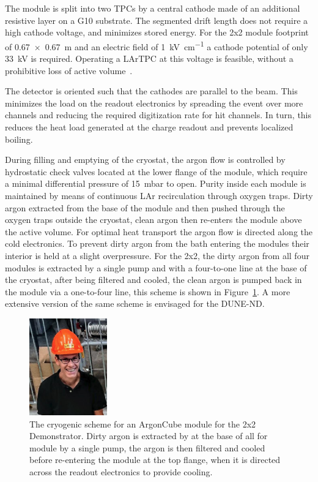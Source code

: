 The module is split into two TPCs by a central cathode made of an additional resistive layer on a G10 substrate. The segmented drift length does not require a high cathode voltage, and minimizes stored energy. For the 2x2 module footprint of \SI{0.67 x 0.67}{\metre} and an electric field of \SI{1}{\kilo\volt\per\centi\metre} a cathode potential of only \SI{33}{\kilo\volt} is required. Operating a LArTPC at this voltage is feasible, without a prohibitive loss of active volume~\cite{argontube}.

The detector is oriented such that the cathodes are parallel to the beam. This minimizes the load on the readout electronics by spreading the event over more channels and reducing the required digitization rate for hit channels. In turn, this reduces the heat load generated at the charge readout and prevents localized boiling.

During filling and emptying of the cryostat, the argon flow is controlled by hydrostatic check valves located at the lower flange of the module, which require a minimal differential pressure of \SI{15}{\milli\bar} to open. Purity inside each module is maintained by means of continuous LAr recirculation through oxygen traps. Dirty argon extracted from the base of the module and then pushed through the oxygen traps outside the cryostat, clean argon then re-enters the module above the active volume. For optimal heat transport the argon flow is directed along the cold electronics. To prevent dirty argon from the bath entering the modules their interior is held at a slight overpressure. For the 2x2, the dirty argon from all four modules is extracted by a single pump and with a four-to-one line at the base of the cryostat, after being filtered and cooled, the clean argon is pumped back in the module via a one-to-four line, this scheme is shown in Figure~\ref{fig:cryo_scheme}. A more extensive version of the same scheme is envisaged for the DUNE-ND.  

\begin{figure}[tbp]
	\centering
	\includegraphics[width=0.3\textwidth]{plots/missing_figure}
	\caption[ArgonCube module cryogenic scheme]{The cryogenic scheme for an ArgonCube module for the 2x2 Demonstrator. Dirty argon is extracted by at the base of all for module by a single pump, the argon is then filtered and cooled before re-entering the module at the top flange, when it is directed across the readout electronics to provide cooling.}
	\label{fig:cryo_scheme}
\end{figure}

